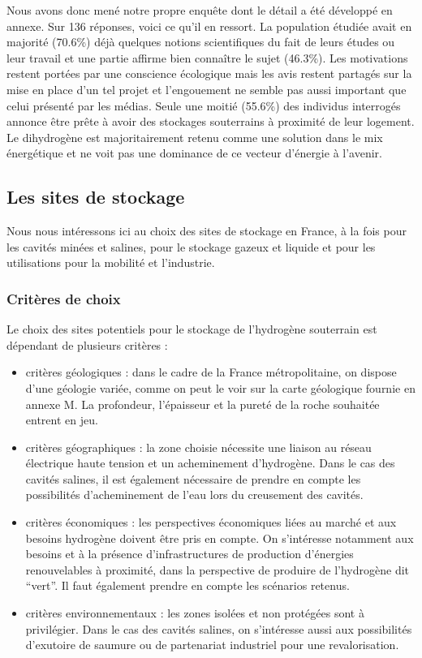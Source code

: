 \documentclass[11pt,french,a4paper]{article}
\begin{document}
Nous avons donc mené notre propre enquête dont le détail a été développé en annexe. Sur 136 réponses, voici ce qu'il en ressort. La population étudiée avait en majorité (70.6\%) déjà quelques notions scientifiques du fait de leurs études ou leur travail et une partie affirme bien connaître le sujet (46.3\%). Les motivations restent portées par une conscience écologique mais les avis restent partagés sur la mise en place d’un tel projet et l’engouement ne semble pas aussi important que celui présenté par les médias. Seule une moitié (55.6\%) des individus interrogés annonce être prête à avoir des stockages souterrains à proximité de leur logement. Le dihydrogène est majoritairement retenu comme une solution dans le mix énergétique et ne voit pas une dominance de ce vecteur d’énergie à l’avenir.


\subsection{Les sites de stockage}
Nous nous intéressons ici au choix des sites de stockage en France, à la fois pour les cavités minées et salines, pour le stockage gazeux et liquide et pour les utilisations pour la mobilité et l'industrie. 
\subsubsection{Critères de choix}
Le choix des sites potentiels pour le stockage de l’hydrogène souterrain est dépendant de plusieurs critères : 
\begin{itemize}
\item critères géologiques : dans le cadre de la France métropolitaine, on dispose d’une géologie variée, comme on peut le voir sur la carte géologique fournie en annexe M. La profondeur, l’épaisseur et la pureté de la roche souhaitée entrent en jeu.
\item critères géographiques : la zone choisie nécessite une liaison au réseau électrique haute tension et un acheminement d’hydrogène. Dans le cas des cavités salines, il est également nécessaire de prendre en compte les possibilités d’acheminement de l’eau lors du creusement des cavités.
\item critères économiques : les perspectives économiques liées au marché et aux besoins hydrogène doivent être pris en compte. On s’intéresse notamment aux besoins et à la présence d’infrastructures de production d’énergies renouvelables à proximité, dans la perspective de produire de l’hydrogène dit “vert”. Il faut également prendre en compte les scénarios retenus.
\item critères environnementaux : les zones isolées et non protégées sont à privilégier. Dans le cas des cavités salines, on s’intéresse aussi aux possibilités d’exutoire de saumure ou de partenariat industriel pour une revalorisation.
\end{itemize}
\end{document}
